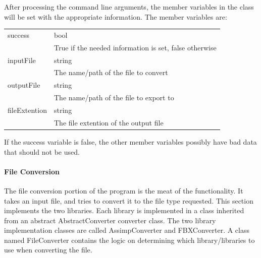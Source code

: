     After processing the command line arguments, the member variables in the class will be set with the appropriate information.  The member variables are:

    \begin{tabular}{l l}
        \centering
        success & bool \\
        & True if the needed information is set, false otherwise \\

        inputFile & string \\
        & The name/path of the file to convert \\

        outputFile & string \\
        & The name/path of the file to export to \\

        fileExtention & string \\
        & The file extention of the output file
    \end{tabular}

    If the success variable is false, the other member variables possibly have bad data that should not be used.

    \paragraph{File Conversion}
    \hfill \break
    The file conversion portion of the program is the meat of the functionality.  It takes an input file, and tries to convert it to the file type requested.
    This section implements the two libraries.  Each library is implemented in a class inherited from an abstract AbstractConverter converter class.  The two 
    library implementation classes are called AssimpConverter and FBXConverter.  A class named FileConverter contains the logic on determining which 
    library/libraries to use when converting the file.

